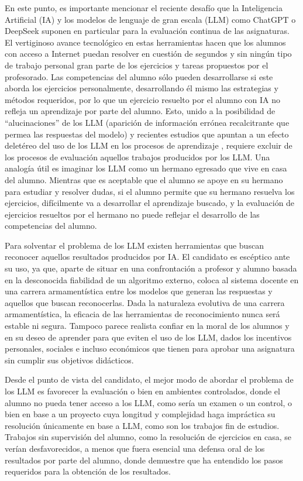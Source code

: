 \documentclass[a4paper,12pt,twoside]{article}
\begin{document}
En este punto, es importante mencionar el reciente desafío que la Inteligencia Artificial (IA) y los modelos de lenguaje de gran escala (LLM) como ChatGPT o DeepSeek suponen en particular para la evaluación continua de las asignaturas. El vertiginoso avance tecnológico en estas herramientas hacen que los alumnos con acceso a Internet puedan resolver en cuestión de segundos y sin ningún tipo de trabajo personal gran parte de los ejercicios y tareas propuestos por el profesorado. Las competencias del alumno sólo pueden desarrollarse si este aborda los ejercicios personalmente, desarrollando él mismo las estrategias y métodos requeridos, por lo que un ejercicio resuelto por el alumno con IA no refleja un aprendizaje por parte del alumno. Esto, unido a la posibilidad de ``alucinaciones'' de los LLM (aparición de información errónea recalcitrante que permea las respuestas del modelo) y recientes estudios que apuntan a un efecto deletéreo del uso de los LLM en los procesos de aprendizaje \cite{ZhaiAI,JUAI}, requiere excluir de los procesos de evaluación aquellos trabajos producidos por los LLM. Una analogía útil es imaginar los LLM como un hermano egresado que vive en casa del alumno. Mientras que es aceptable que el alumno se apoye en su hermano para estudiar y resolver dudas, si el alumno permite que su hermano resuelva los ejercicios, difícilmente va a desarrollar el aprendizaje buscado, y la evaluación de ejercicios resueltos por el hermano no puede reflejar el desarrollo de las competencias del alumno.

Para solventar el problema de los LLM existen herramientas que buscan reconocer aquellos resultados producidos por IA. El candidato es escéptico ante su uso, ya que, aparte de situar en una confrontación a profesor y alumno basada en la desconocida fiabilidad de un algoritmo externo, coloca al sistema docente en una carrera armamentística entre los modelos que generan las respuestas y aquellos que buscan reconocerlas. Dada la naturaleza evolutiva de una carrera armamentística, la eficacia de las herramientas de reconocimiento nunca será estable ni segura. Tampoco parece realista confiar en la moral de los alumnos y en su deseo de aprender para que eviten el uso de los LLM, dados los incentivos personales, sociales e incluso económicos que tienen para aprobar una asignatura sin cumplir sus objetivos didácticos.

Desde el punto de vista del candidato, el mejor modo de abordar el problema de los LLM es favorecer la evaluación o bien en ambientes controlados, donde el alumno no pueda tener acceso a los LLM, como sería un examen o un control, o bien en base a un proyecto cuya longitud y complejidad haga impráctica su resolución únicamente en base a LLM, como son los trabajos fin de estudios. Trabajos sin supervisión del alumno, como la resolución de ejercicios en casa, se verían desfavorecidos, a menos que fuera esencial una defensa oral de los resultados por parte del alumno, donde demuestre que ha entendido los pasos requeridos para la obtención de los resultados.
\end{document}
